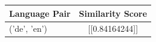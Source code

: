 \begin{tabular}{|l|c|}
\hline
Language Pair & Similarity Score \\
\hline
('de', 'en') & [[0.84164244]] \\
\hline
\end{tabular}

